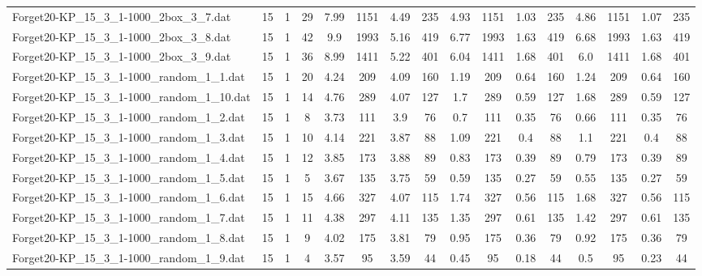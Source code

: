 \begin{sidewaystable}[!ht]
{\begin{tabular}{lccccccccccccccc}
Forget20-KP\_15\_3\_1-1000\_2box\_3\_7.dat & 15 & 1 & 29 & 7.99 & 1151 & 4.49 & 235 & 4.93 & 1151 & 1.03 & 235 & 4.86 & 1151 & 1.07 & 235 \\
Forget20-KP\_15\_3\_1-1000\_2box\_3\_8.dat & 15 & 1 & 42 & 9.9 & 1993 & 5.16 & 419 & 6.77 & 1993 & 1.63 & 419 & 6.68 & 1993 & 1.63 & 419 \\
Forget20-KP\_15\_3\_1-1000\_2box\_3\_9.dat & 15 & 1 & 36 & 8.99 & 1411 & 5.22 & 401 & 6.04 & 1411 & 1.68 & 401 & 6.0 & 1411 & 1.68 & 401 \\
Forget20-KP\_15\_3\_1-1000\_random\_1\_1.dat & 15 & 1 & 20 & 4.24 & 209 & 4.09 & 160 & 1.19 & 209 &  \textcolor{blue2}{0.64} & 160 & 1.24 & 209 &  \textcolor{blue2}{0.64} & 160 \\
Forget20-KP\_15\_3\_1-1000\_random\_1\_10.dat & 15 & 1 & 14 & 4.76 & 289 & 4.07 & 127 & 1.7 & 289 &  \textcolor{blue2}{0.59} & 127 & 1.68 & 289 &  \textcolor{blue2}{0.59} & 127 \\
Forget20-KP\_15\_3\_1-1000\_random\_1\_2.dat & 15 & 1 & 8 & 3.73 & 111 & 3.9 & 76 & 0.7 & 111 &  \textcolor{blue2}{0.35} & 76 & 0.66 & 111 &  \textcolor{blue2}{0.35} & 76 \\
Forget20-KP\_15\_3\_1-1000\_random\_1\_3.dat & 15 & 1 & 10 & 4.14 & 221 & 3.87 & 88 & 1.09 & 221 &  \textcolor{blue2}{0.4} & 88 & 1.1 & 221 &  \textcolor{blue2}{0.4} & 88 \\
Forget20-KP\_15\_3\_1-1000\_random\_1\_4.dat & 15 & 1 & 12 & 3.85 & 173 & 3.88 & 89 & 0.83 & 173 &  \textcolor{blue2}{0.39} & 89 & 0.79 & 173 &  \textcolor{blue2}{0.39} & 89 \\
Forget20-KP\_15\_3\_1-1000\_random\_1\_5.dat & 15 & 1 & 5 & 3.67 & 135 & 3.75 & 59 & 0.59 & 135 &  \textcolor{blue2}{0.27} & 59 & 0.55 & 135 &  \textcolor{blue2}{0.27} & 59 \\
Forget20-KP\_15\_3\_1-1000\_random\_1\_6.dat & 15 & 1 & 15 & 4.66 & 327 & 4.07 & 115 & 1.74 & 327 & 0.56 & 115 & 1.68 & 327 & 0.56 & 115 \\
Forget20-KP\_15\_3\_1-1000\_random\_1\_7.dat & 15 & 1 & 11 & 4.38 & 297 & 4.11 & 135 & 1.35 & 297 &  \textcolor{blue2}{0.61} & 135 & 1.42 & 297 &  \textcolor{blue2}{0.61} & 135 \\
Forget20-KP\_15\_3\_1-1000\_random\_1\_8.dat & 15 & 1 & 9 & 4.02 & 175 & 3.81 & 79 & 0.95 & 175 &  \textcolor{blue2}{0.36} & 79 & 0.92 & 175 &  \textcolor{blue2}{0.36} & 79 \\
Forget20-KP\_15\_3\_1-1000\_random\_1\_9.dat & 15 & 1 & 4 & 3.57 & 95 & 3.59 & 44 & 0.45 & 95 &  \textcolor{blue2}{0.18} & 44 & 0.5 & 95 & 0.23 & 44 \\

\end{tabular}}
\end{sidewaystable}
